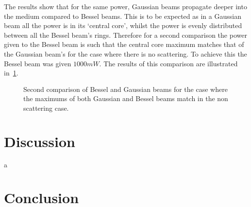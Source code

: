 The results show that for the same power, Gaussian beams propagate deeper into the medium compared to Bessel beams.
This is to be expected as in a Gaussian beam all the power is in its `central core', whilst the power is evenly distributed between all the Bessel beam's rings.
Therefore for a second comparison the power given to the Bessel beam is such that the central core maximum matches that of the Gaussian beam's for the case where there is no scattering.
To achieve this the Bessel beam was given $1000mW$.%
The results of this comparison are illustrated in~\cref{fig:2ndcomp}.

\begin{figure}[!ht]
    \centering
    \caption{Second comparison of Bessel and Gaussian beams for the case where the maximums of both Gaussian and Bessel beams match in the non scattering case.}
    \label{fig:2ndcomp}
\end{figure}


\section{Discussion}


a~\cite{mignon2016fractional}
\section{Conclusion}



